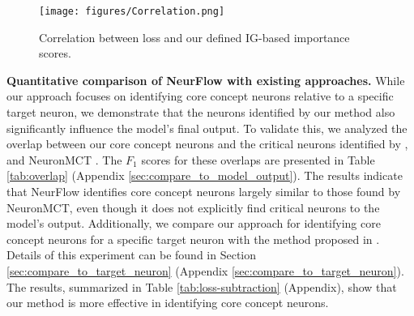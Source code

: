 \begin{wrapfigure}{r}{0.5\textwidth}
    \centering
    \vspace{-3mm}    \texttt{[image: figures/Correlation.png]}
    \vspace{-6mm}
    \caption{Correlation between loss and our defined IG-based importance scores.}\label{figure3}
    \vspace{-4mm}
\end{wrapfigure}
\noindent \textbf{Quantitative comparison of NeurFlow with existing approaches.}
While our approach focuses on identifying core concept neurons relative to a specific target neuron, we demonstrate that the neurons identified by our method also significantly influence the model's final output. 
To validate this, we analyzed the overlap between our core concept neurons and the critical neurons identified by \citet{NEUCEPT}, and NeuronMCT \citep{neuronmct}. The $F_1$ scores for these overlaps are presented in Table \ref{tab:overlap} (Appendix \ref{sec:compare_to_model_output}). The results indicate that NeurFlow identifies core concept neurons largely similar to those found by NeuronMCT, even though it does not explicitly find critical neurons to the model’s output.
Additionally, we compare our approach for identifying core concept neurons for a specific target neuron with the method proposed in \citet{Olah}. 
Details of this experiment can be found in Section \ref{sec:compare_to_target_neuron} (Appendix \ref{sec:compare_to_target_neuron}). The results, summarized in Table \ref{tab:loss-subtraction} (Appendix), show that our method is more effective in identifying core concept neurons.

